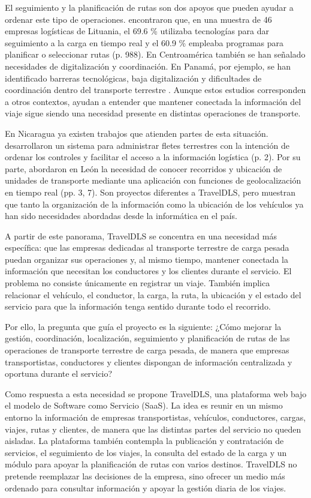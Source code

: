 El seguimiento y la planificación de rutas son dos apoyos que pueden ayudar a ordenar este tipo de operaciones. \textcite{pauzuoliene2024smart} encontraron que, en una muestra de 46 empresas logísticas de Lituania, el 69.6 \% utilizaba tecnologías para dar seguimiento a la carga en tiempo real y el 60.9 \% empleaba programas para planificar o seleccionar rutas (p. 988). En Centroamérica también se han señalado necesidades de digitalización y coordinación. En Panamá, por ejemplo, se han identificado barreras tecnológicas, baja digitalización y dificultades de coordinación dentro del transporte terrestre \parencite[p. 10]{castillo2025potenciando}. Aunque estos estudios corresponden a otros contextos, ayudan a entender que mantener conectada la información del viaje sigue siendo una necesidad presente en distintas operaciones de transporte.

En Nicaragua ya existen trabajos que atienden partes de esta situación. \textcite{aragon2018implementacion} desarrollaron un sistema para administrar fletes terrestres con la intención de ordenar los controles y facilitar el acceso a la información logística (p. 2). Por su parte, \textcite{garcia2022desarrollo} abordaron en León la necesidad de conocer recorridos y ubicación de unidades de transporte mediante una aplicación con funciones de geolocalización en tiempo real (pp. 3, 7). Son proyectos diferentes a TravelDLS, pero muestran que tanto la organización de la información como la ubicación de los vehículos ya han sido necesidades abordadas desde la informática en el país.

A partir de este panorama, TravelDLS se concentra en una necesidad más específica: que las empresas dedicadas al transporte terrestre de carga pesada puedan organizar sus operaciones y, al mismo tiempo, mantener conectada la información que necesitan los conductores y los clientes durante el servicio. El problema no consiste únicamente en registrar un viaje. También implica relacionar el vehículo, el conductor, la carga, la ruta, la ubicación y el estado del servicio para que la información tenga sentido durante todo el recorrido.

Por ello, la pregunta que guía el proyecto es la siguiente: ¿Cómo mejorar la gestión, coordinación, localización, seguimiento y planificación de rutas de las operaciones de transporte terrestre de carga pesada, de manera que empresas transportistas, conductores y clientes dispongan de información centralizada y oportuna durante el servicio?

Como respuesta a esta necesidad se propone TravelDLS, una plataforma web bajo el modelo de Software como Servicio (SaaS). La idea es reunir en un mismo entorno la información de empresas transportistas, vehículos, conductores, cargas, viajes, rutas y clientes, de manera que las distintas partes del servicio no queden aisladas. La plataforma también contempla la publicación y contratación de servicios, el seguimiento de los viajes, la consulta del estado de la carga y un módulo para apoyar la planificación de rutas con varios destinos. TravelDLS no pretende reemplazar las decisiones de la empresa, sino ofrecer un medio más ordenado para consultar información y apoyar la gestión diaria de los viajes.

